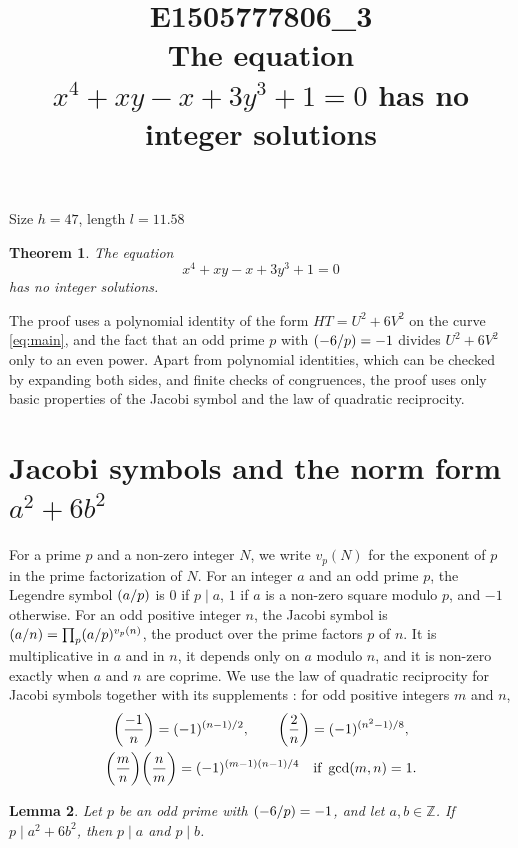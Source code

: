 \documentclass[11pt]{article}
\title{\textbf{E1505777806\_3}\\[4pt] {\Large The equation $x^{4}+xy-x+3y^{3}+1=0$ has no integer solutions}}
\author{}
\date{}
\newtheorem{theorem}{Theorem}
\newtheorem{lemma}[theorem]{Lemma}
\newcommand{\Z}{\mathbb{Z}}
\newcommand{\leg}[2]{\mathchoice{\biggl(\dfrac{#1}{#2}\biggr)}{(#1/#2)}{(#1/#2)}{(#1/#2)}}
\begin{document}
\maketitle
\vspace{-8ex}
\begin{center}
Size $h=47$, length $l=11.58$
\end{center}

\begin{theorem}\label{thm:main}
The equation
\begin{equation}\label{eq:main}
x^{4}+xy-x+3y^{3}+1=0
\end{equation}
has no integer solutions.
\end{theorem}

The proof uses a polynomial identity of the form $HT=U^2+6V^2$ on the curve \eqref{eq:main}, and the fact that an odd prime $p$ with $\leg{-6}{p}=-1$ divides $U^2+6V^2$ only to an even power. Apart from polynomial identities, which can be checked by expanding both sides, and finite checks of congruences, the proof uses only basic properties of the Jacobi symbol and the law of quadratic reciprocity.

\section{\texorpdfstring{Jacobi symbols and the norm form $a^2+6b^2$}{Jacobi symbols and the norm form}}

For a prime $p$ and a non-zero integer $N$, we write $v_p(N)$ for the exponent of $p$ in the prime factorization of $N$. For an integer $a$ and an odd prime $p$, the Legendre symbol $\leg{a}{p}$ is $0$ if $p\mid a$, $1$ if $a$ is a non-zero square modulo $p$, and $-1$ otherwise. For an odd positive integer $n$, the Jacobi symbol is $\leg{a}{n}=\prod_p\leg{a}{p}^{v_p(n)}$, the product over the prime factors $p$ of $n$. It is multiplicative in $a$ and in $n$, it depends only on $a$ modulo $n$, and it is non-zero exactly when $a$ and $n$ are coprime. We use the law of quadratic reciprocity for Jacobi symbols together with its supplements \cite[Chapter~5, \S2]{IR}: for odd positive integers $m$ and $n$,
\begin{gather*}
\leg{-1}{n}=(-1)^{(n-1)/2},\qquad\leg{2}{n}=(-1)^{(n^2-1)/8},\\
\leg{m}{n}\leg{n}{m}=(-1)^{(m-1)(n-1)/4}\quad\text{if }\gcd(m,n)=1.
\end{gather*}

\begin{lemma}\label{lem:divides}
Let $p$ be an odd prime with $\leg{-6}{p}=-1$, and let $a,b\in\Z$. If $p\mid a^2+6b^2$, then $p\mid a$ and $p\mid b$.
\end{lemma}
\end{document}

